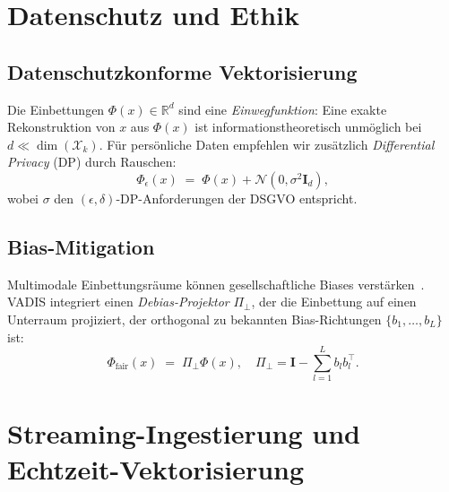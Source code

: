 ﻿\documentclass[12pt,a4paper]{article}
\begin{document}
\section{Datenschutz und Ethik}
\label{sec:ethik}

\subsection{Datenschutzkonforme Vektorisierung}

Die Einbettungen $\Phi(x) \in \mathbb{R}^d$ sind eine 
\emph{Einwegfunktion}: Eine exakte Rekonstruktion von $x$ aus 
$\Phi(x)$ ist informationstheoretisch unmöglich bei $d \ll \dim(\mathcal{X}_k)$.
Für persönliche Daten empfehlen wir zusätzlich 
\emph{Differential Privacy} (DP) durch Rauschen:
\[
  \Phi_\epsilon(x) \;=\; \Phi(x) + \mathcal{N}(0, \sigma^2 \mathbf{I}_d),
\]
wobei $\sigma$ den $(\epsilon, \delta)$-DP-Anforderungen der DSGVO entspricht.

\subsection{Bias-Mitigation}

Multimodale Einbettungsräume können gesellschaftliche Biases 
verstärken~\cite{bender2021stochastic}. VADIS integriert einen 
\emph{Debias-Projektor} $\Pi_{\perp}$, der die Einbettung auf 
einen Unterraum projiziert, der orthogonal zu bekannten 
Bias-Richtungen $\{b_1, \ldots, b_L\}$ ist:
\[
  \Phi_{\text{fair}}(x) \;=\; \Pi_{\perp} \Phi(x), \quad
  \Pi_{\perp} = \mathbf{I} - \sum_{l=1}^L b_l b_l^\top.
\]

\section{Streaming-Ingestierung und Echtzeit-Vektorisierung}
\label{sec:streaming}
\end{document}
